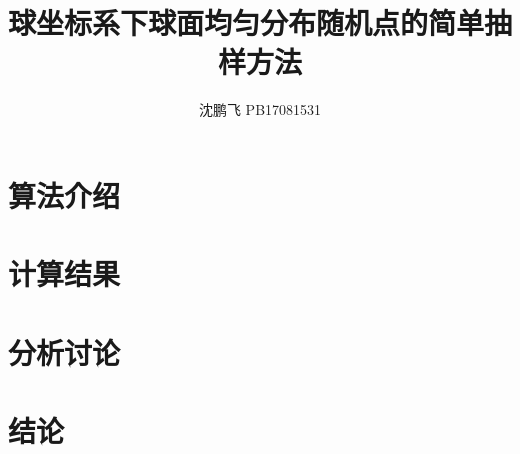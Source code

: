 \documentclass[12pt,a4paper]{article}
\title{\heiti \Huge 球坐标系下球面均匀分布随机点的简单抽样方法}
\author{沈鹏飞 PB17081531}
\begin{document}
	\maketitle
	\tableofcontents
	\newpage
	\section{算法介绍}
	\section{计算结果}
	\section{分析讨论}
	\section{结论}
\end{document}
